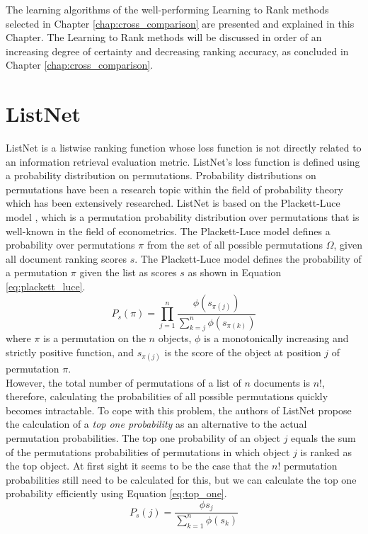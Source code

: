 \label{chap:ltr_methods}
The learning algorithms of the well-performing Learning to Rank methods selected in Chapter \ref{chap:cross_comparison} are presented and explained in this Chapter. The Learning to Rank methods will be discussed in order of an increasing degree of certainty and decreasing ranking accuracy, as concluded in Chapter \ref{chap:cross_comparison}.

\section{ListNet}
\label{sec:ltrmethods_listnet}
ListNet \cite{Cao2007} is a listwise ranking function whose loss function is not directly related to an information retrieval evaluation metric. ListNet's loss function is defined using a probability distribution on permutations. Probability distributions on permutations have been a research topic within the field of probability theory which has been extensively researched. ListNet is based on the Plackett-Luce model \cite{Plackett1975,Luce1959}, which is a permutation probability distribution over permutations that is well-known in the field of econometrics. The Plackett-Luce model defines a probability over permutations $\pi$ from the set of all possible permutations $\Omega$, given all document ranking scores $s$. The Plackett-Luce model defines the probability of a permutation $\pi$ given the list as scores $s$ as shown in Equation \ref{eq:plackett_luce}.
\begin{equation}
P_s(\pi) = \prod\limits_{j=1}^{n}\frac{\phi(s_{\pi(j)})}{\sum\nolimits_{k=j}^{n}\phi(s_{\pi(k)})}
\label{eq:plackett_luce}
\end{equation}
where $\pi$ is a permutation on the $n$ objects, $\phi$ is a monotonically increasing and strictly positive function, and $s_{\pi(j)}$ is the score of the object at position $j$ of permutation $\pi$.\\

However, the total number of permutations of a list of $n$ documents is $n!$, therefore, calculating the probabilities of all possible permutations quickly becomes intractable. To cope with this problem, the authors of ListNet propose the calculation of a \emph{top one probability} as an alternative to the actual permutation probabilities. The top one probability of an object $j$ equals the sum of the permutations probabilities of permutations in which object $j$ is ranked as the top object. At first sight it seems to be the case that the $n!$ permutation probabilities still need to be calculated for this, but we can calculate the top one probability efficiently using Equation \ref{eq:top_one}.
\begin{equation}
P_s(j) = \frac{\phi{s_j}}{\sum\nolimits_{k=1}^{n}\phi(s_k)}
\label{eq:top_one}
\end{equation}

